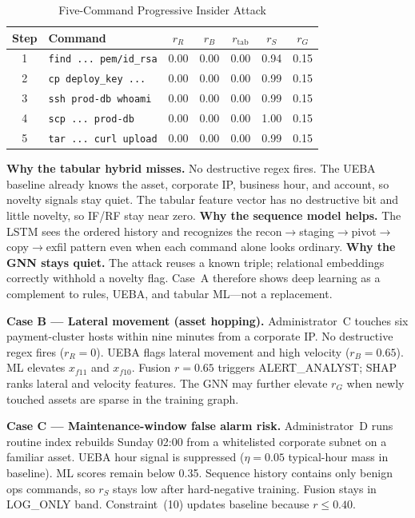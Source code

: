 \documentclass{ieeeaccess}
\begin{document}
\begin{table}[!t]
\caption{Five-Command Progressive Insider Attack}
\label{tab:sequence-attack}
\centering
\scriptsize
\begin{tabular}{@{}clccccc@{}}
\toprule
\textbf{Step} & \textbf{Command} & $r_R$ & $r_B$ & $r_{\mathrm{tab}}$ & $r_S$ & $r_G$ \\
\midrule
1 & \texttt{find ... pem/id\_rsa} & 0.00 & 0.00 & 0.00 & 0.94 & 0.15 \\
2 & \texttt{cp deploy\_key ...} & 0.00 & 0.00 & 0.00 & 0.99 & 0.15 \\
3 & \texttt{ssh prod-db whoami} & 0.00 & 0.00 & 0.00 & 0.99 & 0.15 \\
4 & \texttt{scp ... prod-db} & 0.00 & 0.00 & 0.00 & 1.00 & 0.15 \\
5 & \texttt{tar ... curl upload} & 0.00 & 0.00 & 0.00 & 0.99 & 0.15 \\
\bottomrule
\end{tabular}
\end{table}

\textbf{Why the tabular hybrid misses.} No destructive regex fires. The UEBA baseline already knows the asset, corporate IP, business hour, and account, so novelty signals stay quiet. The tabular feature vector has no destructive bit and little novelty, so IF/RF stay near zero. \textbf{Why the sequence model helps.} The LSTM sees the ordered history and recognizes the recon$\rightarrow$staging$\rightarrow$pivot$\rightarrow$copy$\rightarrow$exfil pattern even when each command alone looks ordinary. \textbf{Why the GNN stays quiet.} The attack reuses a known triple; relational embeddings correctly withhold a novelty flag. Case~A therefore shows deep learning as a complement to rules, UEBA, and tabular ML---not a replacement.

\textbf{Case B --- Lateral movement (asset hopping).} Administrator~C touches six payment-cluster hosts within nine minutes from a corporate IP. No destructive regex fires ($r_R=0$). UEBA flags lateral movement and high velocity ($r_B=0.65$). ML elevates $x_{f11}$ and $x_{f10}$. Fusion $r=0.65$ triggers ALERT\_ANALYST; SHAP ranks lateral and velocity features. The GNN may further elevate $r_G$ when newly touched assets are sparse in the training graph.

\textbf{Case C --- Maintenance-window false alarm risk.} Administrator~D runs routine index rebuilds Sunday 02:00 from a whitelisted corporate subnet on a familiar asset. UEBA hour signal is suppressed ($\eta=0.05$ typical-hour mass in baseline). ML scores remain below 0.35. Sequence history contains only benign ops commands, so $r_S$ stays low after hard-negative training. Fusion stays in LOG\_ONLY band. Constraint~(10) updates baseline because $r\leq 0.40$.
\end{document}
